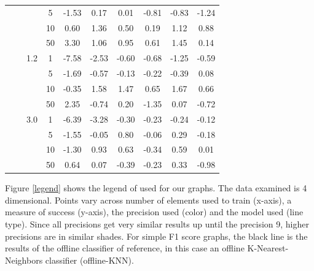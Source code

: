 \documentclass[conference]{IEEEtran}
\begin{document}
\begin{table}[htbp]
\begin{minipage}{\linewidth}
\begin{center}
{\begin{tabular}{|c|c|c|c|c|c|c|c|c|c|}
                    \cline{4-10} &               &              & 5           & -1.53      & 0.17       & 0.01       & -0.81      & -0.83      & -1.24      \\
                    \cline{4-10} &               &              & 10          & 0.60       & 1.36       & 0.50       & 0.19       & 1.12       & 0.88       \\
                    \cline{4-10} &               &              & 50          & 3.30       & 1.06       & 0.95       & 0.61       & 1.45       & 0.14       \\
                    \cline{3-10} &               & 1.2          & 1           & -7.58      & -2.53      & -0.60      & -0.68      & -1.25      & -0.59      \\
                    \cline{4-10} &               &              & 5           & -1.69      & -0.57      & -0.13      & -0.22      & -0.39      & 0.08       \\
                    \cline{4-10} &               &              & 10          & -0.35      & 1.58       & 1.47       & 0.65       & 1.67       & 0.66       \\
                    \cline{4-10} &               &              & 50          & 2.35       & -0.74      & 0.20       & -1.35      & 0.07       & -0.72      \\
                    \cline{3-10} &               & 3.0          & 1           & -6.39      & -3.28      & -0.30      & -0.23      & -0.24      & -0.12      \\
                    \cline{4-10} &               &              & 5           & -1.55      & -0.05      & 0.80       & -0.06      & 0.29       & -0.18      \\
                    \cline{4-10} &               &              & 10          & -1.30      & 0.93       & 0.63       & -0.34      & 0.59       & 0.01       \\
                    \cline{4-10} &               &              & 50          & 0.64       & 0.07       & -0.39      & -0.23      & 0.33       & -0.98      \\
                    \hline
                \end{tabular}
            }
            \label{tab2}
        \end{center}
    \end{minipage}
\end{table}

Figure \ref{legend} shows the legend of used for our graphs. The data examined
is 4 dimensional. Points vary across number of elements used to train (x-axis),
a measure of success (y-axis), the precision used (color) and the model used
(line type). Since all precisions get very similar results up until the
precision 9, higher precisions are in similar shades. For simple F1 score
graphs, the black line is the results of the offline classifier of reference, in
this case an offline K-Nearest-Neighbors classifier (offline-KNN).
\end{document}
